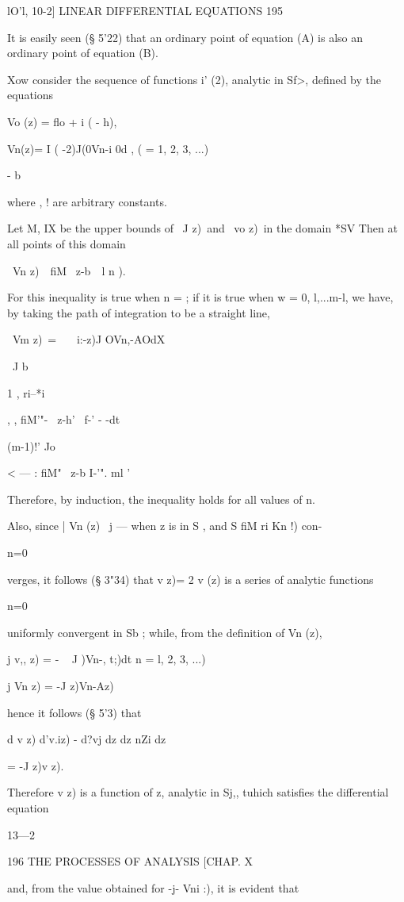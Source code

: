 lO'l, 10-2] LINEAR DIFFERENTIAL EQUATIONS 195

It is easily seen (§ 5'22) that an ordinary point of equation (A) is
also an ordinary point of equation (B).

Xow consider the sequence of functions i' (2), analytic in Sf>,
defined by the equations

Vo (z) = flo + i ( - h),

Vn(z)= I ( -2)J(0Vn-i 0d , ( = 1, 2, 3, ...)

- b

where , ! are arbitrary constants.

Let M, IX be the upper bounds of \ J z)\ and \ vo z)\ in the domain
*SV Then at all points of this domain

\ Vn z)\ \ fiM \ z-b\ \ l n ).

For this inequality is true when n = ; if it is true when w = 0,
l,...m-l, we have, by taking the path of integration to be a straight
line,

\ Vm z)\ = \ \ \ i:-z)J OVn,-AOdX

\ J b

1 , ri--*i

  , , fiM'"- \ z-h' \ f-' - -dt

(m-1)!' Jo

< — : fiM" \ z-b I-'". ml '

Therefore, by induction, the inequality holds for all values of n.

Also, since | Vn (z) \ j — when z is in S , and S fiM ri Kn !) con-

    n=0

verges, it follows (§ 3"34) that v z)= 2 v (z) is a series of analytic
functions

n=0

uniformly convergent in Sb ; while, from the definition of Vn (z),

j v,, z) = - ~ J \;)Vn-, t;)dt n = l, 2, 3, ...)

j Vn z) = -J z)Vn-Az)\

hence it follows (§ 5'3) that

d v z) d'v.iz) - d?vj dz dz nZi dz

= -J z)v z).

Therefore v z) is a function of z, analytic in Sj,, tuhich satisfies
the differential equation

13—2

196 THE PROCESSES OF ANALYSIS [CHAP. X

and, from the value obtained for -j- Vni :), it is evident that

